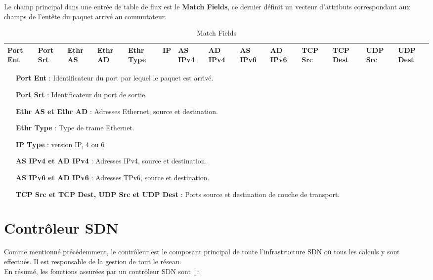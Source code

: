 Le champ principal dans une entrée de table de flux est le \textbf{Match Fields}, ce dernier définit un vecteur d'attributs correspondant aux champs de l’entête du paquet arrivé au commutateur.\\

\begin{table}[h]
\begin{center}
\begin{tabular}{ | m{0.7cm} | m{0.7cm} | m{0.7cm} | m{0.7cm} | m{0.7cm} | m{0.7cm} | m{0.7cm} | m{0.7cm} | m{0.7cm} | m{0.7cm} | m{0.7cm} | m{0.7cm} | m{0.7cm} | m{0.7cm} |}
\hline
\rowcolor[rgb]{0.80,0.80,0.80}
 Port Ent & Port Srt & Ethr AS & Ethr AD & Ethr Type & IP & AS IPv4 & AD IPv4 & AS IPv6 & AD IPv6 & TCP Src & TCP Dest & UDP Src & UDP Dest\\
\hline
\end{tabular}
\caption{Match Fields}
\end{center}
\end{table}

\begin{itemize}
\item[\textbf{Port Ent}]: Identificateur du port par lequel le paquet est arrivé.
\item[\textbf{Port Srt}]: Identificateur du port de sortie.
\item[\textbf{Ethr AS et Ethr AD}]: Adresses Ethernet, source et destination. 
\item[\textbf{Ethr Type}]: Type de trame Ethernet.
\item[\textbf{IP Type}]: version IP, 4 ou 6
\item[\textbf{AS IPv4 et AD IPv4}]: Adresses IPv4, source et destination.
\item[\textbf{AS IPv6 et AD IPv6}]: Adresses TPv6, source et destination.
\item[\textbf{TCP Src et TCP Dest, UDP Src et UDP Dest}]: Ports source et destination de couche de transport.
\end{itemize}

\newpage
\section{Contrôleur SDN}
Comme mentionné précédemment, le contrôleur est le composant principal de toute l'infrastructure SDN où tous les calculs y sont effectués. Il est responsable de la gestion de tout le réseau.\\
En résumé, les fonctions assurées par un contrôleur SDN sont [\cite{6}]: \\

